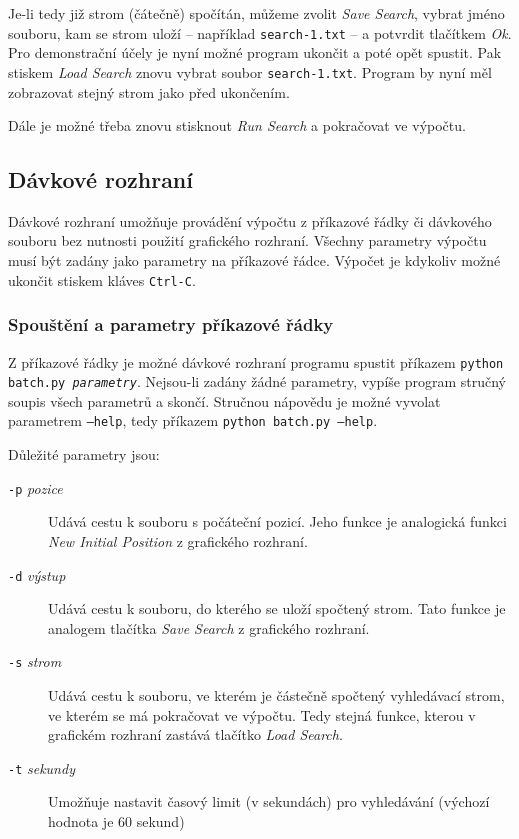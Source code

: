 \documentclass{article}
\begin{document}
Je-li tedy již strom (čátečně) spočítán, můžeme zvolit \emph{Save Search}, vybrat jméno souboru, kam se strom uloží --
například \texttt{search-1.txt} -- a potvrdit tlačítkem \emph{Ok}. Pro demonstrační účely je nyní možné program ukončit
a poté opět spustit. Pak stiskem \emph{Load Search} znovu vybrat soubor \texttt{search-1.txt}. Program by nyní měl
zobrazovat stejný strom jako před ukončením.

Dále je možné třeba znovu stisknout \emph{Run Search} a pokračovat ve výpočtu.

\subsection{Dávkové rozhraní}
Dávkové rozhraní umožňuje provádění výpočtu z příkazové řádky či dávkového souboru bez nutnosti použití grafického
rozhraní. Všechny parametry výpočtu musí být zadány jako parametry na příkazové řádce. Výpočet je kdykoliv možné ukončit
stiskem kláves \texttt{Ctrl-C}.

\subsubsection{Spouštění a parametry příkazové řádky}
Z příkazové řádky je možné dávkové rozhraní programu spustit příkazem \texttt{python batch.py \textit{parametry}}.
Nejsou-li zadány žádné parametry, vypíše program stručný soupis všech parametrů a skončí. Stručnou nápovědu je možné
vyvolat parametrem \texttt{--help}, tedy příkazem \texttt{python batch.py --help}.

Důležité parametry jsou:\begin{description}
  \item[\texttt{-p} \textit{pozice}] Udává cestu k souboru s počáteční pozicí. Jeho funkce je analogická funkci
  \emph{New Initial Position} z grafického rozhraní.
  \item[\texttt{-d} \textit{výstup}] Udává cestu k souboru, do kterého se uloží spočtený strom. Tato funkce je analogem
  tlačítka \emph{Save Search} z grafického rozhraní.
  \item[\texttt{-s} \textit{strom}] Udává cestu k souboru, ve kterém je částečně spočtený vyhledávací strom, ve kterém
  se má pokračovat ve výpočtu. Tedy stejná funkce, kterou v grafickém rozhraní zastává tlačítko \emph{Load Search}.
  \item[\texttt{-t} \textit{sekundy}] Umožňuje nastavit časový limit (v sekundách) pro vyhledávání (výchozí hodnota je
  60 sekund)
\end{description}
\end{document}
